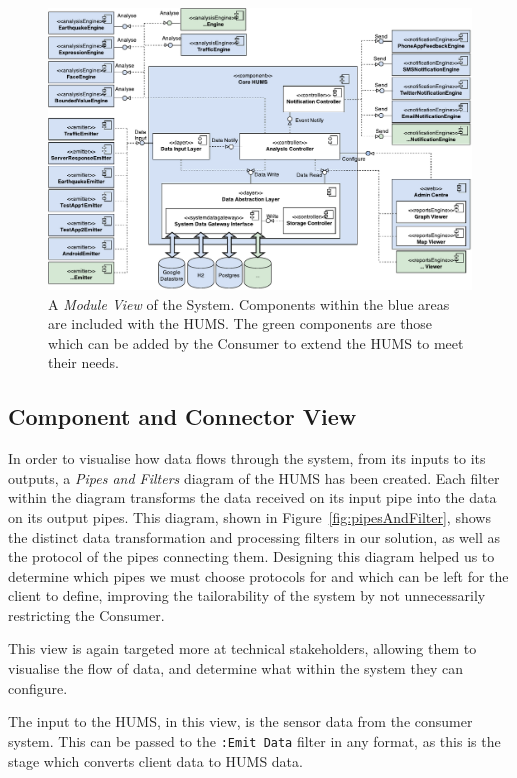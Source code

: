 \documentclass[10pt,a4paper]{article}
\begin{document}
\begin{figure}[ht]
  \centering
  \includegraphics[width=\textwidth]{images/component.pdf}
  \caption{A \emph{Module View} of the System. Components within the blue areas are included with the HUMS. The green components are those which can be added by the Consumer to extend the HUMS to meet their needs.}
  \label{fig:modules}
\end{figure}

\subsection{Component and Connector View}
In order to visualise how data flows through the system, from its inputs to its outputs, a \emph{Pipes and Filters} diagram of the HUMS has been created. 
Each filter within the diagram transforms the data received on its input pipe into the data on its output pipes.
This diagram, shown in Figure~\ref{fig:pipesAndFilter}, shows the distinct data transformation and processing filters in our solution, as well as the protocol of the pipes connecting them. Designing this diagram helped us to determine which pipes we must choose protocols for and which can be left for the client to define, improving the tailorability of the system by not unnecessarily restricting the Consumer.

This view is again targeted more at technical stakeholders, allowing them to visualise the flow of data, and determine what within the system they can configure.

The input to the HUMS, in this view, is the sensor data from the consumer system. This can be passed to the \texttt{:Emit Data} filter in any format, as this is the stage which converts client data to HUMS data. 
\end{document}

